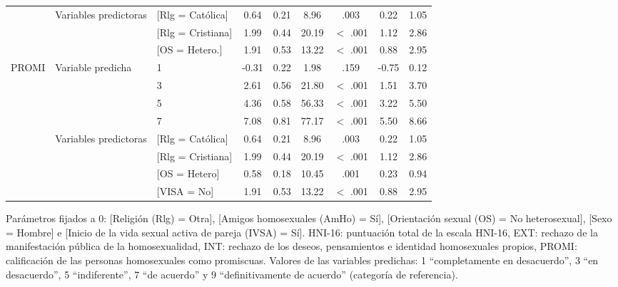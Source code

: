 \documentclass[a4paper, 11pt]{article}
\begin{document}
\begin{table}[h]
\begin{tabular}{c p{} lcccccc}
& \multirow{3}{2cm}{Variables predictoras} & [Rlg = Católica] & 0.64 & 0.21 & 8.96 & .003 & 0.22 & 1.05 \\
&& [Rlg = Cristiana] & 1.99 & 0.44 & 20.19 & \(<\) .001 & 1.12 & 2.86 \\
&& [OS = Hetero.] & 1.91 & 0.53 & 13.22 & \(<\) .001 & 0.88 & 2.95 \\

\multirow{8}{*}{PROMI} & \multirow{4}{2cm}{Variable predicha}& 1 & -0.31 & 0.22 & 1.98 & .159 & -0.75 &0.12 \\
& & 3 & 2.61 & 0.56 & 21.80 & \(<\) .001 & 1.51 & 3.70 \\
&& 5 & 4.36 & 0.58 & 56.33 & \(<\) .001 & 3.22 & 5.50 \\
&& 7 & 7.08 & 0.81 & 77.17 & \(<\) .001 & 5.50 & 8.66 \\

& \multirow{4}{2cm}{Variables predictoras} & [Rlg = Católica] & 0.64 & 0.21 & 8.96 & .003 & 0.22 & 1.05 \\
&& [Rlg = Cristiana] & 1.99 & 0.44 & 20.19 & \(<\) .001 & 1.12 & 2.86 \\
&& [OS = Hetero] & 0.58 & 0.18 & 10.45 & .001 & 0.23 & 0.94 \\
&& [VISA = No] & 1.91 & 0.53 & 13.22 & \(<\) .001 & 0.88 & 2.95 \\
\hline
\end{tabular}
\label{tabla:03}
\end{table}
Parámetros fijados a 0: [Religión (Rlg) = Otra], [Amigos homosexuales (AmHo) = Sí], [Orientación
sexual (OS) = No heterosexual], [Sexo = Hombre] e [Inicio de la vida sexual activa de pareja (IVSA)
= Sí]. HNI-16: puntuación total de la escala HNI-16, EXT: rechazo de la manifestación pública de la
homosexualidad, INT: rechazo de los deseos, pensamientos e identidad homosexuales propios,
PROMI: calificación de las personas homosexuales como promiscuas. Valores de las variables
predichas: 1 “completamente en desacuerdo”, 3 “en desacuerdo”, 5 “indiferente”, 7 “de acuerdo” y
9 “definitivamente de acuerdo” (categoría de referencia).
\end{document}
